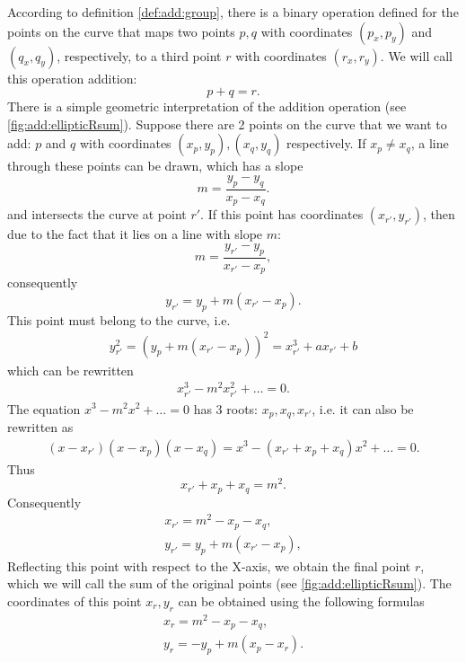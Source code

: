 According to definition \ref{def:add:group}, there is a binary operation defined for the points on the curve that maps two points $p, q$ with coordinates $(p_x, p_y)$ and $(q_x, q_y)$, respectively, to a third point $r$ with coordinates $(r_x, r_y)$. We will call this operation addition:
\[
p + q = r.
\]
There is a simple geometric interpretation of the addition operation (see \autoref{fig:add:ellipticRsum}). Suppose there are 2 points on the curve that we want to add: $p$ and $q$ with coordinates $(x_p, y_p), (x_q, y_q)$ respectively. If $x_p \ne x_q$, a line through these points can be drawn, which has a slope 
\[
m = \frac{y_p - y_q}{x_p - x_q}.
\]
and intersects the curve at point $r'$. If this point has coordinates $(x_{r'}, y_{r'})$, then due to the fact that it lies on a line with slope $m$:
\[
m = \frac{y_{r'} - y_p}{x_{r'} - x_p},
\]
consequently
\[
y_{r'} = y_p + m \left(x_{r'} - x_p\right).
\]
This point must belong to the curve, i.e.
\begin{eqnarray}
y_{r'}^2 = \left(y_p + m \left(x_{r'} - x_p\right)\right)^2 = x_{r'}^3 + a x_{r'} + b
\nonumber
\end{eqnarray}
which can be rewritten
\begin{eqnarray}
x_{r'}^3 - m^2 x_{r'}^2 + \dots = 0.
\nonumber
\end{eqnarray}
The equation $x^3 - m^2 x^2 + \dots = 0$ has 3 roots: $x_p, x_q, x_{r'}$, i.e. it can also be rewritten as
\begin{eqnarray}
(x - x_{r'})(x - x_p)(x - x_q) = x^3 - (x_{r'} + x_p + x_q) x^2 + \dots = 0.
\nonumber
\end{eqnarray}
Thus
\[
x_{r'} + x_p + x_q = m^2.
\]
Consequently
\begin{eqnarray}
x_{r'} = m^2 - x_p - x_q,
\nonumber \\
y_{r'} = y_p + m \left(x_{r'} - x_p\right),
\nonumber
\end{eqnarray}
Reflecting this point with respect to the X-axis, we obtain the final point $r$, which we will call the sum of the original points (see \autoref{fig:add:ellipticRsum}). The coordinates of this point $x_r, y_r$ can be obtained using the following formulas
\begin{eqnarray}
x_{r} = m^2 - x_p - x_q,
\nonumber \\
y_{r} = - y_p + m \left(x_p - x_r\right).
\label{eq:add:discretmath:elliptic:add}
\end{eqnarray}




